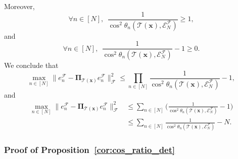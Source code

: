 \documentclass[twoside,11pt]{book}
\numberwithin{theorem}{chapter}
\numberwithin{definition}{chapter}
\numberwithin{proposition}{chapter}
\numberwithin{corollary}{chapter}
\numberwithin{example}{chapter}
\numberwithin{lemma}{chapter}
\numberwithin{assumption}{chapter}
\DeclareMathOperator{\F}{\mathcal{F}}
\begin{document}
Moreover, 
\begin{equation}
\forall n \in [N], \:\:\frac{1}{\cos^{2} \theta_{n}(\mathcal{T}(\bm{x}),\mathcal{E}^{\mathcal{F}}_{N}) } \geq 1,
\end{equation}
and
\begin{equation}
\forall n \in [N], \:\:\frac{1}{\cos^{2} \theta_{n}(\mathcal{T}(\bm{x}),\mathcal{E}^{\mathcal{F}}_{N}) } -1 \geq 0.
\end{equation}
We conclude that
\begin{equation}
\max_{ n \in [N]} \|e_{n}^{\F} - \bm{\Pi}_{\mathcal{T}(\bm{x})} e_{n}^{\F}\|_{\mathcal{F}}^{2} \leq \prod\limits_{n \in [N]} \frac{1}{\cos^{2} \theta_{n}(\mathcal{T}(\bm{x}),\mathcal{E}^{\mathcal{F}}_{N}) } -1,
\end{equation}
and
\begin{align}
\max_{ n \in [N]} \|e_{n}^{\F} - \bm{\Pi}_{\mathcal{T}(\bm{x})} e_{n}^{\F}\|_{\mathcal{F}}^{2} & \leq \sum\limits_{n \in [N]} \Big( \frac{1}{\cos^{2} \theta_{n}(\mathcal{T}(\bm{x}),\mathcal{E}^{\mathcal{F}}_{N}) } -1\Big)\\
& \leq \sum\limits_{n \in [N]} \frac{1}{\cos^{2} \theta_{n}(\mathcal{T}(\bm{x}),\mathcal{E}^{\mathcal{F}}_{N}) } -N.
\end{align}
\subsubsection{Proof of Proposition~\ref{cor:cos_ratio_det}}
\end{document}
